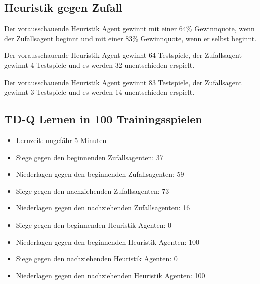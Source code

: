 \subsection{Heuristik gegen Zufall}
Der vorausschauende Heuristik Agent gewinnt mit einer 64\% Gewinnquote, wenn der Zufallsagent beginnt und mit einer 83\% Gewinnquote, wenn er selbst beginnt.

Der vorausschauende Heuristik Agent gewinnt 64 Testspiele, der Zufallsagent gewinnt 4 Testspiele und es werden 32 unentschieden erspielt.

Der vorausschauende Heuristik Agent gewinnt 83 Testspiele, der Zufallsagent gewinnt 3 Testspiele und es werden 14 unentschieden erspielt. 

\subsection{TD-Q Lernen in 100 Trainingsspielen}
\begin{itemize}
\item Lernzeit: ungefähr 5 Minuten

\item Siege gegen den beginnenden Zufallsagenten: 37
\item Niederlagen gegen den beginnenden Zufallsagenten: 59

\item Siege gegen den nachziehenden Zufallsagenten: 73
\item Niederlagen gegen den nachziehenden Zufallsagenten: 16

\item Siege gegen den beginnenden Heuristik Agenten: 0
\item Niederlagen gegen den beginnenden Heuristik Agenten: 100

\item Siege gegen den nachziehenden Heuristik Agenten: 0
\item Niederlagen gegen den nachziehenden Heuristik Agenten: 100
\end{itemize}

